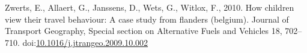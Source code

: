 \documentclass[]{elsarticle} %
\newlength{\cslhangindent}
\newlength{\cslentryspacingunit} %
\newenvironment{CSLReferences}[2] %
 {%
  \setlength{\parindent}{0pt}
  \ifodd #1
  \let\oldpar\par
  \def\par{\hangindent=\cslhangindent\oldpar}
  \fi
  \setlength{\parskip}{#2\cslentryspacingunit}
 }%
 {}
\begin{document}
\begin{CSLReferences}{1}{0}
\leavevmode{}%
Zwerts, E., Allaert, G., Janssens, D., Wets, G., Witlox, F., 2010. How
children view their travel behaviour: A case study from flanders
(belgium). Journal of Transport Geography, Special {section} on
{Alternative Fuels} and {Vehicles} 18, 702--710.
doi:\href{https://doi.org/10.1016/j.jtrangeo.2009.10.002}{10.1016/j.jtrangeo.2009.10.002}

\end{CSLReferences}
\end{document}
